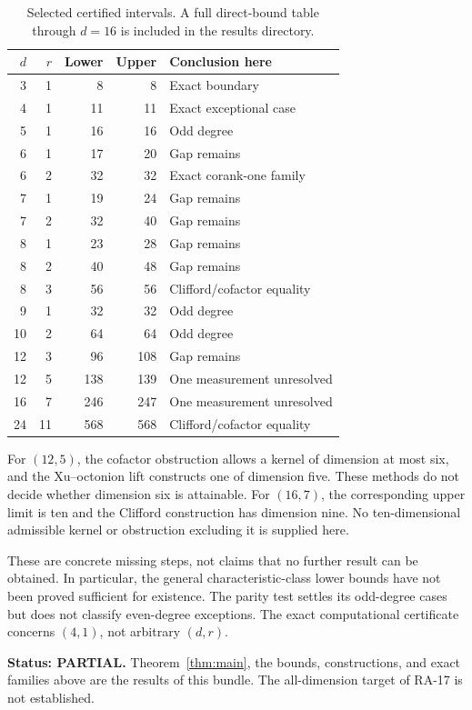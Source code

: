 \documentclass[11pt]{article}
\theoremstyle{definition}
\begin{document}
\begin{table}[ht]
\centering
\begin{tabular}{rrrrl}
\toprule
$d$ & $r$ & Lower & Upper & Conclusion here\\
\midrule
3&1&8&8&Exact boundary\\
4&1&11&11&Exact exceptional case\\
5&1&16&16&Odd degree\\
6&1&17&20&Gap remains\\
6&2&32&32&Exact corank-one family\\
7&1&19&24&Gap remains\\
7&2&32&40&Gap remains\\
8&1&23&28&Gap remains\\
8&2&40&48&Gap remains\\
8&3&56&56&Clifford/cofactor equality\\
9&1&32&32&Odd degree\\
10&2&64&64&Odd degree\\
12&3&96&108&Gap remains\\
12&5&138&139&One measurement unresolved\\
16&7&246&247&One measurement unresolved\\
24&11&568&568&Clifford/cofactor equality\\
\bottomrule
\end{tabular}
\caption{Selected certified intervals. A full direct-bound table through $d=16$ is included in the results directory.}\label{tab:bounds}
\end{table}

For $(12,5)$, the cofactor obstruction allows a kernel of dimension at most six, and the Xu--octonion lift constructs one of dimension five. These methods do not decide whether dimension six is attainable. For $(16,7)$, the corresponding upper limit is ten and the Clifford construction has dimension nine. No ten-dimensional admissible kernel or obstruction excluding it is supplied here.

These are concrete missing steps, not claims that no further result can be obtained. In particular, the general characteristic-class lower bounds have not been proved sufficient for existence. The parity test settles its odd-degree cases but does not classify even-degree exceptions. The exact computational certificate concerns $(4,1)$, not arbitrary $(d,r)$.

\textbf{Status: PARTIAL.} Theorem~\ref{thm:main}, the bounds, constructions, and exact families above are the results of this bundle. The all-dimension target of RA-17 is not established.
\end{document}
